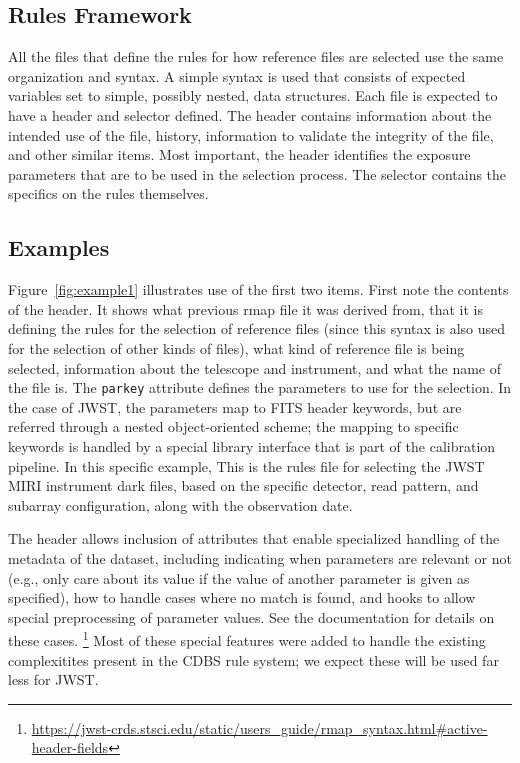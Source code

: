 \documentclass[final,authoryear,5p,times,twocolumn]{elsarticle}
\begin{document}
\subsection{Rules Framework}

All the files that define the rules for how reference files are selected
use the same organization and syntax.
A simple syntax is used that consists of expected variables set to simple, 
possibly nested, data structures. Each file is expected to have a header 
and selector defined. The header contains information about the intended 
use of the file, history, information to validate the integrity of the file,
and other similar items. Most important, the header identifies the exposure
parameters that are to be used in the selection process. The selector 
contains the specifics on the rules themselves.

\subsection{Examples}

Figure~\ref{fig:example1} illustrates use of the first two items. First note the contents
of the header. It shows what previous rmap file it was derived from, that it is defining
the rules for the selection of reference files (since this syntax is also used for
the selection of other kinds of files), what kind of reference file is being selected, information about the telescope and instrument, and what the name of the file is. 
The {\tt parkey} attribute defines the parameters to use for the selection. In the
case of JWST, the parameters map to FITS header keywords, but are referred through a
nested object-oriented scheme; the mapping to specific keywords is handled by a special
library interface that is part of the calibration pipeline. In this specific example,
This is the rules file for selecting the JWST MIRI instrument dark files, based on 
the specific detector, read pattern, and subarray configuration, along with the 
observation date.

The header allows inclusion of attributes that enable specialized handling of the metadata 
of the dataset, including indicating when parameters are relevant or not (e.g., only 
care about its value if the value of another parameter is given as specified), 
how to handle cases where no match is found, and hooks to allow special preprocessing
of parameter values. See the documentation for details on these cases.
\footnote{\url{https://jwst-crds.stsci.edu/static/users\_guide/rmap_syntax.html\#active-header-fields}}
Most of these special features were added to handle the existing complexitites present in the CDBS rule system; we expect these will be used far less for JWST.
\end{document}
